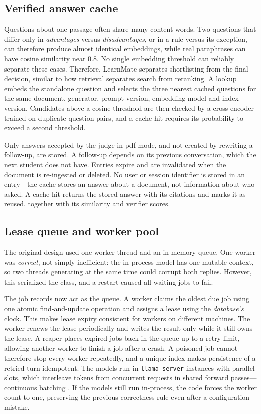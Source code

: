 \documentclass[conference]{IEEEtran}
\newcommand{\sys}{LearnMate}
\begin{document}
\subsection{Verified answer cache}
\label{sec:cache}

Questions about one passage often share many content words. Two questions that differ only in
\emph{advantages} versus \emph{disadvantages}, or in a rule versus its exception, can therefore
produce almost identical embeddings, while real paraphrases can have cosine similarity near $0.8$.
No single embedding threshold can reliably separate these cases. Therefore, \sys{} separates
shortlisting from the final decision, similar to how retrieval separates search from reranking. A
lookup embeds the standalone question and selects the three nearest cached questions for the same
document, generator, prompt version, embedding model and index version. Candidates above a cosine
threshold are then checked by a cross-encoder trained on duplicate question pairs, and a cache hit
requires its probability to exceed a second threshold.

Only answers accepted by the judge in pdf mode, and not created by rewriting a follow-up, are stored.
A follow-up depends on its previous conversation, which the next student does not have. Entries
expire and are invalidated when the document is re-ingested or deleted. No user or session identifier
is stored in an entry---the cache stores an answer about a document, not information about who asked.
A cache hit returns the stored answer with its citations and marks it as reused, together with its
similarity and verifier scores.

\subsection{Lease queue and worker pool}
\label{sec:serving}

The original design used one worker thread and an in-memory queue. One worker was \emph{correct},
not simply inefficient: the in-process model has one mutable context, so two threads generating at
the same time could corrupt both replies. However, this serialized the class, and a restart caused
all waiting jobs to fail.

The job records now act as the queue. A worker claims the oldest due job using one atomic
find-and-update operation and assigns a lease using the \emph{database's} clock. This makes lease
expiry consistent for workers on different machines. The worker renews the lease periodically and
writes the result only while it still owns the lease. A reaper places expired jobs back in the queue
up to a retry limit, allowing another worker to finish a job after a crash. A poisoned job cannot
therefore stop every worker repeatedly, and a unique index makes persistence of a retried turn
idempotent. The models run in \texttt{llama-server} instances with parallel slots, which interleave
tokens from concurrent requests in shared forward passes---continuous batching \cite{yu2022orca}.
If the models still run in-process, the code forces the worker count to one, preserving the previous
correctness rule even after a configuration mistake.
\end{document}
